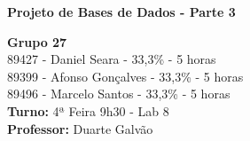 \documentclass[12pt]{report}
\begin{document}
    \begin{titlepage}
        \begin{center}

            \vspace*{\fill}
            \Huge
            \textbf{Projeto de Bases de Dados - Parte 3}

            \vspace*{\fill}

            \Large
            \textbf{Grupo 27} \\
            89427 - Daniel Seara - 33,3\% - 5 horas \\
            89399 - Afonso Gonçalves - 33,3\% - 5 horas \\
            89496 - Marcelo Santos - 33,3\% - 5 horas \\

            \bigskip
            \textbf{Turno:} 4ª Feira 9h30 - Lab 8\\ \textbf{Professor:} Duarte Galvão

        \end{center}
    \end{titlepage}
\end{document}
